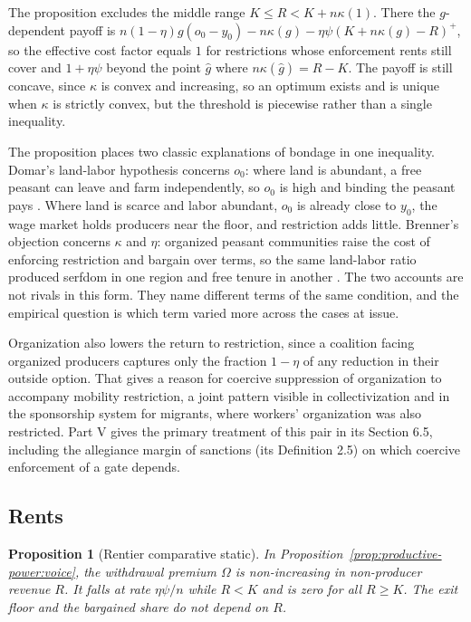 \documentclass[11pt,letterpaper]{article}
\newtheorem{proposition}[theorem]{Proposition}
\theoremstyle{definition}
\theoremstyle{remark}
\begin{document}
The proposition excludes the middle range $K\le R<K+n\kappa(1)$. There the $g$-dependent payoff is $n(1-\eta)g(o_0-y_0)-n\kappa(g)-\eta\psi(K+n\kappa(g)-R)^+$, so the effective cost factor equals $1$ for restrictions whose enforcement rents still cover and $1+\eta\psi$ beyond the point $\hat g$ where $n\kappa(\hat g)=R-K$. The payoff is still concave, since $\kappa$ is convex and increasing, so an optimum exists and is unique when $\kappa$ is strictly convex, but the threshold is piecewise rather than a single inequality.

The proposition places two classic explanations of bondage in one inequality. Domar's land-labor hypothesis concerns $o_0$: where land is abundant, a free peasant can leave and farm independently, so $o_0$ is high and binding the peasant pays \citep{domar1970}. Where land is scarce and labor abundant, $o_0$ is already close to $y_0$, the wage market holds producers near the floor, and restriction adds little. Brenner's objection concerns $\kappa$ and $\eta$: organized peasant communities raise the cost of enforcing restriction and bargain over terms, so the same land-labor ratio produced serfdom in one region and free tenure in another \citep{brenner1976}. The two accounts are not rivals in this form. They name different terms of the same condition, and the empirical question is which term varied more across the cases at issue.

Organization also lowers the return to restriction, since a coalition facing organized producers captures only the fraction $1-\eta$ of any reduction in their outside option. That gives a reason for coercive suppression of organization to accompany mobility restriction, a joint pattern visible in collectivization and in the sponsorship system for migrants, where workers' organization was also restricted. Part V \citep{long2026coercive} gives the primary treatment of this pair in its Section 6.5, including the allegiance margin of sanctions (its Definition 2.5) on which coercive enforcement of a gate depends.

\subsection{Rents}

\begin{proposition}[Rentier comparative static]
\label{prop:productive-power:rentier}
In Proposition~\ref{prop:productive-power:voice}, the withdrawal premium $\Omega$ is non-increasing in non-producer revenue $R$. It falls at rate $\eta\psi/n$ while $R<K$ and is zero for all $R\ge K$. The exit floor and the bargained share do not depend on $R$.
\end{proposition}
\end{document}
